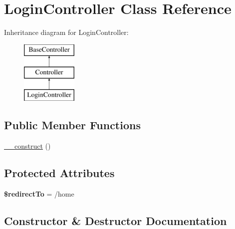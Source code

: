 \hypertarget{class_app_1_1_http_1_1_controllers_1_1_auth_1_1_login_controller}{}\section{Login\+Controller Class Reference}
\label{class_app_1_1_http_1_1_controllers_1_1_auth_1_1_login_controller}
Inheritance diagram for Login\+Controller\+:\begin{figure}[H]
\begin{center}
\leavevmode
\includegraphics[height=3.000000cm]{class_app_1_1_http_1_1_controllers_1_1_auth_1_1_login_controller}
\end{center}
\end{figure}
\subsection*{Public Member Functions}
\begin{DoxyCompactItemize}
\item 
\mbox{\hyperlink{class_app_1_1_http_1_1_controllers_1_1_auth_1_1_login_controller_a095c5d389db211932136b53f25f39685}{\+\_\+\+\_\+construct}} ()
\end{DoxyCompactItemize}
\subsection*{Protected Attributes}
\begin{DoxyCompactItemize}
\item 
\mbox{\label{class_app_1_1_http_1_1_controllers_1_1_auth_1_1_login_controller_a1d19101ee5de7186666ce86a530cd501}} 
{\bfseries \$redirect\+To} = \textquotesingle{}/home\textquotesingle{}
\end{DoxyCompactItemize}


\subsection{Constructor \& Destructor Documentation}
\mbox{\label{class_app_1_1_http_1_1_controllers_1_1_auth_1_1_login_controller_a095c5d389db211932136b53f25f39685}} 
